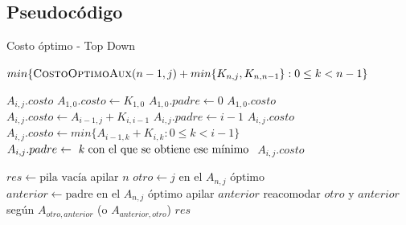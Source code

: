 \documentclass[a4paper]{report}
\begin{document}
\newpage

\subsection{Pseudocódigo}

\setlength{\textfloatsep}{0pt}

\begin{algorithm} \caption{Costo óptimo - Top Down}

    \begin{algorithmic}[1]
    
            \State \Return $min \{ \textsc{CostoOptimoAux}(n-1,j) + min \{ K_{n,j}, K_{n,n-1} \} : 0 \leq k < n-1 \}$
        \EndFunction
    
                \State \Return $A_{i,j}.costo$
            \Else
                    \State $A_{1,0}.costo \leftarrow K_{1,0}$ 
                    \State $A_{1,0}.padre \leftarrow 0$
                    \State \Return $A_{1,0}.costo$ 
                    \State $A_{i,j}.costo \leftarrow A_{i-1,j} + K_{i,i-1}$ 
                    \State $A_{i,j}.padre \leftarrow i-1$ 
                    \State \Return $A_{i,j}.costo$ 
                \Else {}
                    \State $A_{i,j}.costo \leftarrow min \{ A_{i-1,k} + K_{i,k} : 0 \leq k < i-1 \}$ 
                    \State $A_{i,j}.padre \leftarrow \text{ \textit{k} con el que se obtiene ese mínimo }$ 
                    \State \Return $A_{i,j}.costo$ 
                \EndIf
            \EndIf
        
        \EndFunction
        
            \State $res \leftarrow \text{pila vacía}$
            \State apilar $n$
            \State $otro \leftarrow j \text{ en el } A_{n,j} \text{ óptimo}$
            \State $anterior \leftarrow \text{padre en el } A_{n,j} \text{ óptimo}$
                \State apilar $anterior$
                \State reacomodar $otro$ y $anterior$ según $A_{otro,anterior}$ (o $A_{anterior,otro}$)
            \EndWhile
            \State \Return $res$
        \EndFunction
    
    \end{algorithmic}

\end{algorithm}
\end{document}
